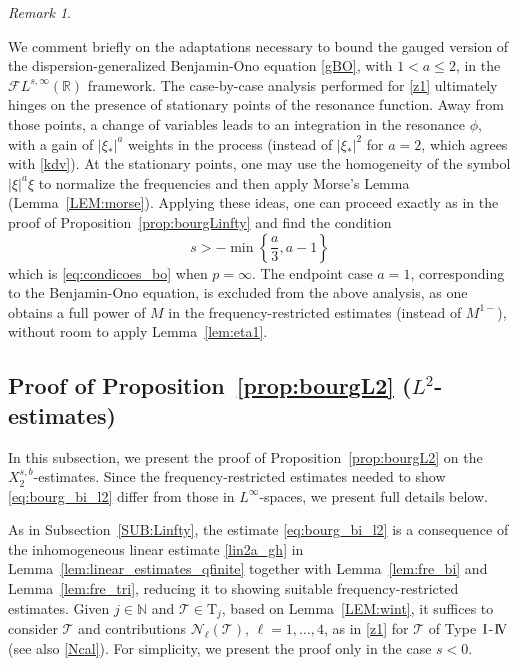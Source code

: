 \documentclass[a4paper,
11pt,  reqno]{amsart}
\newcommand{\I}{\hspace{0.2mm}\textup{I}\hspace{0.2mm}}
\newcommand{\IV}{\textup{I \hspace{-2.9mm} V}}
\newcommand{\5}{\textup{V}}
\newcommand{\FL}{\mathcal{F} L}
\theoremstyle{remark}
\newtheorem{remark}[theorem]{Remark}
\newcommand{\R}{\mathbb{R}}
\newcommand{\TT}{\mathcal{T}}
\newcommand{\Tr}{\mathrm{T}}
\renewcommand{\l}{\ell}
\newcommand{\N}{\mathbb{N}}
\numberwithin{equation}{section}
\numberwithin{theorem}{section}
\newcommand{\Ncal}{\mathcal{N}}
\begin{document}
\begin{remark}\label{remark:bo1}

    We comment briefly on the adaptations necessary to bound the gauged version of the dispersion-generalized Benjamin-Ono equation \eqref{gBO}, with $1< a\le 2$, in the $\FL^{s,\infty}(\R)$ framework.
    The case-by-case analysis performed for \eqref{z1} ultimately hinges on the presence of stationary points of the resonance function. Away from those points, a change of variables leads to an integration in the resonance $\phi$, with a gain of $|\xi_\ast|^a$ weights in the process (instead of $|\xi_\ast|^2$ for $a=2$, which agrees with \eqref{kdv}). At the stationary points, one may use the homogeneity of the symbol $|\xi|^a \xi$ to normalize the frequencies and then apply Morse's Lemma (Lemma~\ref{LEM:morse}).
    Applying these ideas, one can proceed exactly as in the proof of Proposition~\ref{prop:bourgLinfty} and find the condition
    $$
    s>-\min\left\{\frac a 3, a-1\right\}
    $$
    which is \eqref{eq:condicoes_bo} when $p=\infty$. The endpoint case $a=1$, corresponding to the Benjamin-Ono equation, is excluded from the above analysis, as one obtains a full power of $M$ in the frequency-restricted estimates (instead of $M^{1-}$), without room to apply Lemma~\ref{lem:eta1}.
\end{remark}





\subsection{Proof of Proposition~\ref{prop:bourgL2} ($L^2$-estimates)}
\label{SUB:L2}


In this subsection, we present the proof of Proposition~\ref{prop:bourgL2}
on the $X^{s, b}_{2}$-estimates.
Since the frequency-restricted estimates needed to show \eqref{eq:bourg_bi_l2} differ from those in $L^\infty$-spaces, we present full details below.




As in Subsection~\ref{SUB:Linfty},
the estimate \eqref{eq:bourg_bi_l2} is a consequence of the inhomogeneous linear estimate \eqref{lin2a_gh} in Lemma~\ref{lem:linear_estimates_qfinite} together with Lemma~\ref{lem:fre_bi} and Lemma~\ref{lem:fre_tri}, reducing it to showing suitable frequency-restricted  estimates.
Given $j\in \N$ and $\TT\in \Tr_j$,
based on Lemma~\ref{LEM:wint}, it suffices to consider $\TT$ and contributions $\Ncal_
\l(\TT)$, $\l=1, \ldots, 4$, as in \eqref{z1} for $\TT$ of Type $\I$-$\IV$ (see also \eqref{Ncal}). {
For simplicity, we present the proof only in the case $s<0$.
}
\end{document}
